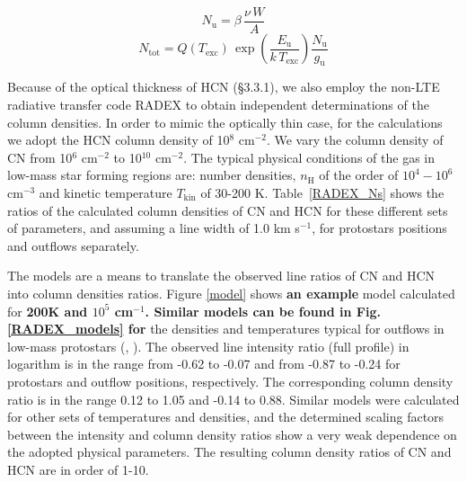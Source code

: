 \documentclass{aa}
\begin{document}
\begin{equation} 
\label{eq3} N_\mathrm{u} = \beta \, \frac{\nu \,W}{A} 
\end{equation} 
\begin{equation} 
\label{eq4} N_\mathrm{tot} = Q(T_\mathrm{exc}) \, \exp(\frac{E_\mathrm{u}}{k \, T_\mathrm{exc}})  \frac{N_\mathrm{u} }{g_\mathrm{u} } 
\end{equation} 

Because of the optical thickness of HCN (\S 3.3.1), we also employ the non-LTE radiative transfer code RADEX 
to obtain independent determinations of the column densities. In order to mimic the optically thin case,
for the calculations we adopt the HCN column density of 10$^8$ cm$^{-2}$. We vary the column density 
of CN from 10$^6$ cm$^{-2}$ to 10$^{10}$ cm$^{-2}$. The typical physical conditions of the gas 
in low-mass star forming regions are: number densities, $n_\mathrm{H}$ of the order of \textbf{$10^{4}-10^{6}$} cm$^{-3}$ 
and kinetic temperature $T_\mathrm{kin}$ of 30-200 K. Table~\ref{RADEX_Ns} shows the ratios of the calculated 
column densities of CN and HCN for these different sets of parameters, and assuming a line width of 1.0 km s$^{-1}$, for protostars positions and outflows separately.

The models are a means to translate the observed line ratios of CN and HCN into column densities ratios. 
Figure \ref{model} shows \textbf{an example} model calculated for \textbf{200K and $10^{5}$ cm$^{-1}$. Similar models can be found in Fig. \ref{RADEX_models} for} the densities and temperatures typical for 
outflows in low-mass protostars (\citealt{vK09}, \citealt{Yil15}). The observed line intensity ratio (full profile) 
in logarithm is in the range from -0.62 to -0.07 and from -0.87 to -0.24 for protostars and outflow positions, respectively. The corresponding column density ratio is
in the range 0.12 to 1.05 and -0.14 to 0.88. Similar models were calculated for other sets of 
temperatures and densities, and the determined scaling factors between the intensity and column
density ratios show a very weak dependence on the adopted physical parameters. The resulting 
column density ratios of CN and HCN are in order of 1-10. 
\end{document}
